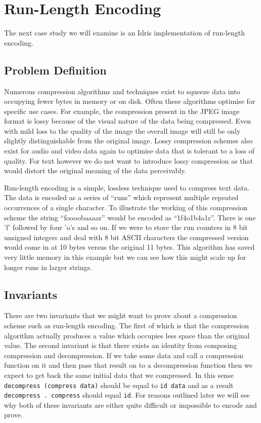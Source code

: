 \documentclass[a4paper, notitlepage]{report}
\begin{document}
\section{Run-Length Encoding}
\label{sec:orgc0c29ac}
The next case study we will examine is an Idris implementation of run-length
encoding.

\subsection{Problem Definition}
\label{sec:org97f1636}
Numerous compression algorithms and techniques exist to squeeze data into
occupying fewer bytes in memory or on disk. Often these algorithms optimise for
specific use cases. For example, the compression present in the JPEG image
format is lossy because of the visual nature of the data being compressed. Even
with mild loss to the quality of the image the overall image will still be only
slightly distinguishable from the original image. Lossy compression schemes also
exist for audio and video data again to optimise data that is tolerant to a loss
of quality. For text however we do not want to introduce lossy compression as
that would distort the original meaning of the data perceivably.

Run-length encoding is a simple, lossless technique used to compress text data.
The data is encoded as a series of ``runs'' which represent multiple repeated
occurrences of a single character. To illustrate the working of this compression
scheme the string ``foooobaaaar'' would be encoded as ``1f4o1b4a1r''. There is
one 'f' followed by four 'o's and so on. If we were to store the run counters in
8 bit unsigned integers and deal with 8 bit ASCII characters the compressed
version would come in at 10 bytes versus the original 11 bytes. This algorithm
has saved very little memory in this example but we can see how this might scale
up for longer runs in larger strings.

\subsection{Invariants}
\label{sec:org9843d3f}
There are two invariants that we might want to prove about a compression scheme
such as run-length encoding. The first of which is that the compression
algorithm actually produces a value which occupies less space than the original
value. The second invariant is that there exists an identity from composing
compression and decompression. If we take some data and call a compression
function on it and then pass that result on to a decompression function then we
expect to get back the same initial data that we compressed. In this sense
\texttt{decompress (compress data)} should be equal to \texttt{id data} and as a result \texttt{decompress
. compress} should equal \texttt{id}. For reasons outlined later we will see why both of
these invariants are either quite difficult or impossible to encode and prove.
\end{document}
